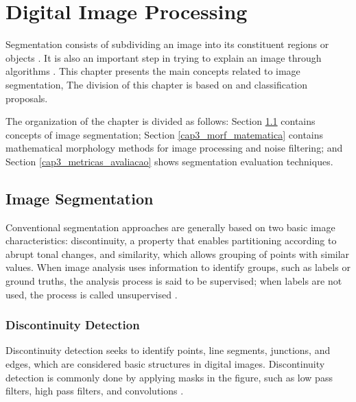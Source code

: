 \chapter{Digital Image Processing}
\label{cap3_seg_imagens}


Segmentation consists of subdividing an image into its constituent regions or objects \cite[Ch. 10]{gonzalez2002digital}.
It is also an important step in trying to explain an image through algorithms \cite{Zhang08imagesegmentation}. 
This chapter presents the main concepts related to image segmentation,
The division of this chapter is based on  and  classification proposals.

The organization of the chapter is divided as follows: Section \ref{cap3_detect_bordas_segment} contains concepts of image segmentation;
Section \ref{cap3_morf_matematica} contains mathematical morphology methods for image processing and noise filtering;
and Section \ref{cap3_metricas_avaliacao} shows segmentation evaluation techniques.

\section{Image Segmentation}
\label{cap3_detect_bordas_segment}

Conventional segmentation approaches are generally based on two basic image characteristics: discontinuity, a property that enables partitioning according to abrupt tonal changes, and similarity, which allows grouping of points with similar values.
When image analysis uses information to identify groups, such as labels or ground truths, the analysis process is said to be supervised; when labels are not used, the process is called unsupervised \cite{gonzalez2002digital}. %

\subsection{Discontinuity Detection}
\label{cap3_descontinuidades}

Discontinuity detection seeks to identify points, line segments, junctions, and edges, which are considered basic structures in digital images.
Discontinuity detection is commonly done by applying masks in the figure, such as low pass filters, high pass filters, and convolutions  \cite{gonzalez2002digital}. %

